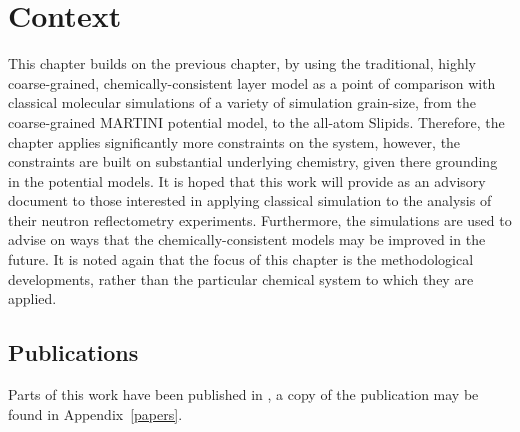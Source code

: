 \section*{Context}
This chapter builds on the previous chapter, by using the traditional, highly coarse-grained, chemically-consistent layer model as a point of comparison with classical molecular simulations of a variety of simulation grain-size, from the coarse-grained MARTINI potential model, to the all-atom Slipids.
Therefore, the chapter applies significantly more constraints on the system, however, the constraints are built on substantial underlying chemistry, given there grounding in the potential models.
It is hoped that this work will provide as an advisory document to those interested in applying classical simulation to the analysis of their neutron reflectometry experiments.
Furthermore, the simulations are used to advise on ways that the chemically-consistent models may be improved in the future.
It is noted again that the focus of this chapter is the methodological developments, rather than the particular chemical system to which they are applied.

\subsection*{Publications}
Parts of this work have been published in , a copy of the publication may be found in Appendix~\ref{papers}.
